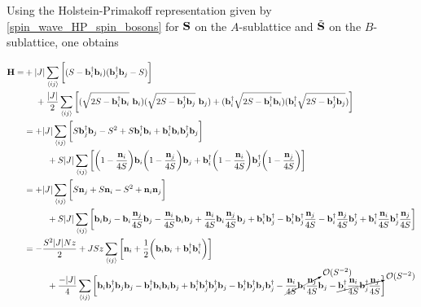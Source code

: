 Using the Holstein-Primakoff representation given by \cref{spin_wave_HP_spin_bosons} for ${\bf S}$ on the $A$-sublattice and $\tilde{{\bf S}}$ on the $B$-sublattice, one obtains 

\begin{equation}
    \begin{split}
    {\bf H} =& + |J| \sum_{\langle ij \rangle} 
    \bigg[ 
    (S - {\bf b}_i^\dagger {\bf b}_i)({\bf b}_j^\dagger {\bf b}_j - S)
    \bigg] \\
    & \textnormal{ } \textnormal{ } \textnormal{ } \textnormal{ } + 
    \frac{|J|}{2} \sum_{\langle ij \rangle} 
    \bigg[ 
    (\sqrt{2S - {\bf b}_i^\dagger {\bf b}_i} \textnormal{ } {\bf b}_i)(\sqrt{2S - {\bf b}_j^\dagger {\bf b}_j} \textnormal{ } {\bf b}_j ) 
    + 
    ({\bf b}_i^\dagger\sqrt{2S - {\bf b}_i^\dagger {\bf b}_i} ) ({\bf b}_i^\dagger\sqrt{2S - {\bf b}_j^\dagger {\bf b}_j})
    \bigg] \\
    &= + |J| \sum_{\langle ij \rangle} 
    \bigg[ 
    S {\bf b}_j^\dagger {\bf b}_j - S^2 + S{\bf b}_i^\dagger {\bf b}_i + {\bf b}_i^\dagger {\bf b}_i {\bf b}_j^\dagger {\bf b}_j
    \bigg] \\
    & \textnormal{ } \textnormal{ } \textnormal{ } \textnormal{ } \textnormal{ } \textnormal{ } \textnormal{ } \textnormal{ } + 
    {S|J|} \sum_{\langle ij \rangle} 
    \bigg[  
    \bigg(1-\frac{{\bf n}_i}{4S}\bigg) {\bf b}_i 
    \bigg(1-\frac{{\bf n}_j}{4S}\bigg) {\bf b}_j 
    + 
     {\bf b}_i^\dagger \bigg(1-\frac{{\bf n}_i}{4S}\bigg)
     {\bf b}_j^\dagger \bigg(1-\frac{{\bf n}_j}{4S}\bigg)
    \bigg] \\
    &= + |J| \sum_{\langle ij \rangle} 
    \bigg[ 
    S {\bf n}_j + S {\bf n}_i - S^2 + {\bf n}_i {\bf n}_j 
    \bigg] \\ 
    & \textnormal{ } \textnormal{ } \textnormal{ } \textnormal{ } \textnormal{ } \textnormal{ } \textnormal{ } \textnormal{ } + 
    {S|J|} \sum_{\langle ij \rangle} 
    \bigg[  
    {\bf b}_i{\bf b}_j - {\bf b}_i \frac{{\bf n}_j}{4S} {\bf b}_j - \frac{{\bf n}_i}{4S} {\bf b}_i {\bf b}_j + \frac{{\bf n}_i}{4S} {\bf b}_i \frac{{\bf n}_j}{4S} {\bf b}_j 
    + 
    {\bf b}_i^\dagger{\bf b}_j^\dagger - {\bf b}_i^\dagger{\bf b}_j^\dagger \frac{{\bf n}_j}{4S} - {\bf b}_i^\dagger \frac{{\bf n}_j}{4S} {\bf b}_j^\dagger + {\bf b}_i^\dagger \frac{{\bf n}_i}{4S}{\bf b}_j^\dagger\frac{{\bf n}_j}{4S}
    \bigg] \\
    &= -\frac{S^2 |J| N z}{2} + J S z\sum_{\langle ij \rangle} 
    \bigg[
    {\bf n}_i + \frac{1}{2} 
    \bigg(
    {\bf b}_i {\bf b}_i + {\bf b}_i^\dagger {\bf b}_i^\dagger \bigg)
    \bigg] \\
    & \textnormal{ } \textnormal{ } \textnormal{ } \textnormal{ } \textnormal{ } \textnormal{ } \textnormal{ } \textnormal{ } + \frac{-|J|}{4} \sum_{\langle ij \rangle} 
    \bigg[
    {\bf b}_i {\bf b}_j^\dagger {\bf b}_j {\bf b}_j 
    - {\bf b}_i^\dagger {\bf b}_i {\bf b}_i {\bf b}_j + {\bf b}_i^\dagger {\bf b}_j^\dagger {\bf b}_j^\dagger {\bf b}_j - {\bf b}_i^\dagger {\bf b}_j^\dagger {\bf b}_j {\bf b}_j^\dagger - \cancelto{\mathcal{O}(S^{-2})}{\frac{{\bf n}_i}{4S} {\bf b}_i \frac{{\bf n}_j}{4S}} {\bf b}_j - \cancelto{\mathcal{O}(S^{-2})}{{\bf b}_i^\dagger \frac{{\bf n}_i}{4S}{\bf b}_j^\dagger\frac{{\bf n}_j}{4S}}
    \bigg] \\
    \end{split}
\end{equation}

